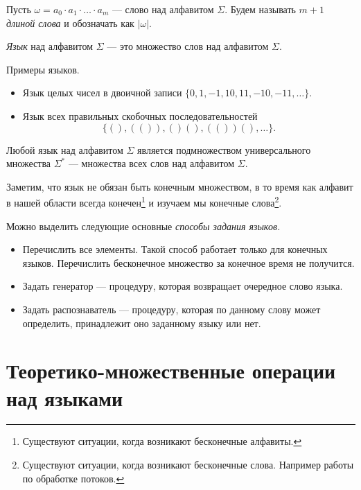 \begin{definition}
Пусть $\omega = a_0 \cdot a_1 \cdot \ldots \cdot a_m$ --- слово над алфавитом $\Sigma$.
Будем называть $m + 1$ \textit{длиной слова} и обозначать как $|\omega|$.
\end{definition}

\begin{definition}
\textit{Язык} над алфавитом $\Sigma$ --- это множество слов над алфавитом $\Sigma$.
\end{definition}

\begin{example}

Примеры языков.

  \begin{itemize}
    \item Язык целых чисел в двоичной записи $\{0, 1, -1, 10, 11, -10, -11, \dots\}.$
    \item Язык всех правильных скобочных последовательностей $$\{(), (()), ()(), (())(), \dots\}.$$
  \end{itemize}
\end{example}

Любой язык над алфавитом $\Sigma$ является подмножеством универсального множества $\Sigma^*$ --- множества всех слов над алфавитом $\Sigma$.

Заметим, что язык не обязан быть конечным множеством, в то время как алфавит в нашей области всегда конечен\footnote{Существуют ситуации, когда возникают бесконечные алфавиты.} и изучаем мы конечные слова\footnote{Существуют ситуации, когда возникают бесконечные слова. Например работы по обработке потоков.}.

Можно выделить следующие основные \textit{способы задания языков.}
\begin{itemize}
\item Перечислить все элементы. Такой способ работает только для конечных языков. Перечислить бесконечное множество за конечное время не получится.
\item Задать генератор --- процедуру, которая возвращает очередное слово языка.
\item Задать распознаватель --- процедуру, которая по данному слову может определить, принадлежит оно заданному языку или нет.
\end{itemize}

\section{Теоретико-множественные операции над языками}

